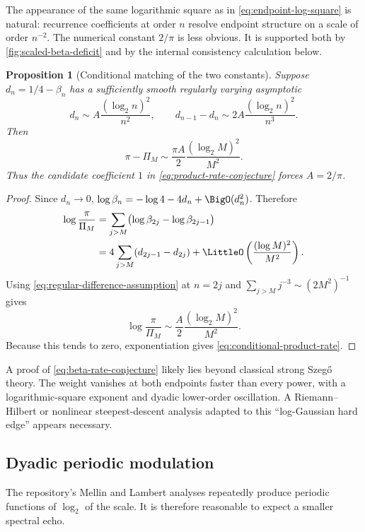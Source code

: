 \documentclass[11pt,oneside]{article}
\newtheorem{proposition}[theorem]{Proposition}
\theoremstyle{definition}
\theoremstyle{remark}
\numberwithin{equation}{section}
\begin{document}
The appearance of the same logarithmic square as in
\cref{eq:endpoint-log-square} is natural: recurrence coefficients at order
$n$ resolve endpoint structure on a scale of order $n^{-2}$.  The numerical
constant $2/\pi$ is less obvious.  It is supported both by
\cref{fig:scaled-beta-deficit} and by the internal consistency calculation
below.

\begin{proposition}[Conditional matching of the two constants]
\label{prop:rate-matching}
Suppose $d_n=1/4-\beta_n$ has a sufficiently smooth regularly varying
asymptotic
\begin{equation}
 d_n\sim A\frac{(\log_2n)^2}{n^2},
 \qquad
 d_{n-1}-d_n\sim
 2A\frac{(\log_2n)^2}{n^3}.
 \label{eq:regular-difference-assumption}
\end{equation}
Then
\begin{equation}
 \pi-\Pi_M\sim
 \frac{\pi A}{2}\frac{(\log_2M)^2}{M^2}.
 \label{eq:conditional-product-rate}
\end{equation}
Thus the candidate coefficient $1$ in
\cref{eq:product-rate-conjecture} forces $A=2/\pi$.
\end{proposition}

\begin{proof}
Since $d_n\to0$,
$\log\beta_n=-\log4-4d_n+\BigO(d_n^2)$.  Therefore
\begin{align*}
 \log\frac{\pi}{\Pi_M}
 &=\sum_{j>M}\bigl(\log\beta_{2j}-\log\beta_{2j-1}\bigr)\\
 &=4\sum_{j>M}(d_{2j-1}-d_{2j})
   +\LittleO\left(\frac{(\log M)^2}{M^2}\right).
\end{align*}
Using \cref{eq:regular-difference-assumption} at $n=2j$ and
$\sum_{j>M}j^{-3}\sim(2M^2)^{-1}$ gives
\begin{equation*}
 \log\frac{\pi}{\Pi_M}
 \sim\frac{A}{2}\frac{(\log_2M)^2}{M^2}.
\end{equation*}
Because this tends to zero, exponentiation gives
\cref{eq:conditional-product-rate}.
\end{proof}

A proof of \cref{eq:beta-rate-conjecture} likely lies beyond classical strong
Szeg\H{o} theory.  The weight vanishes at both endpoints faster than every
power, with a logarithmic-square exponent and dyadic lower-order oscillation.
A Riemann--Hilbert or nonlinear steepest-descent analysis adapted to this
``log-Gaussian hard edge'' appears necessary.

\subsection{Dyadic periodic modulation}
The repository's Mellin and Lambert analyses repeatedly produce periodic
functions of $\log_2$ of the scale.  It is therefore reasonable to expect a
smaller spectral echo.
\end{document}
